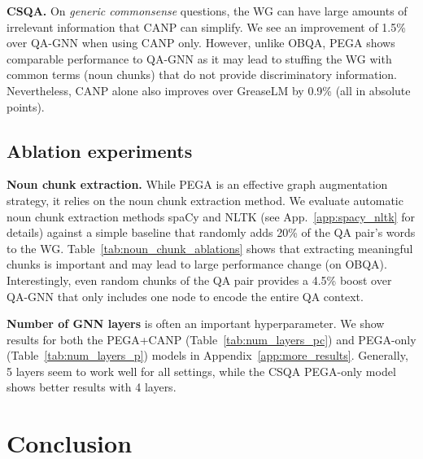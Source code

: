 \documentclass[11pt]{article}
\renewcommand{\paragraph}[1]{\vspace{1mm}\noindent\textbf{#1}}
\begin{document}
\paragraph{CSQA.}
On \emph{generic commonsense} questions, the WG can have large amounts of irrelevant information that CANP can simplify.
We see an improvement of 1.5\% over QA-GNN when using CANP only.
However, unlike OBQA, PEGA shows comparable performance to QA-GNN as it may lead to stuffing the WG with common terms (noun chunks) that do not provide discriminatory information.
Nevertheless, CANP alone also improves over GreaseLM by 0.9\% (all in absolute points).

\subsection{Ablation experiments}
\label{sec:ablation}





\paragraph{Noun chunk extraction.}
While PEGA is an effective graph augmentation strategy, it relies on the noun chunk extraction method.
We evaluate automatic noun chunk extraction methods spaCy and NLTK (see App.~\ref{app:spacy_nltk} for details) against a simple baseline that randomly adds 20\% of the QA pair's words to the WG.
Table~\ref{tab:noun_chunk_ablations} shows that extracting meaningful chunks is important and may lead to large performance change (on OBQA).
Interestingly, even random chunks of the QA pair provides a 4.5\% boost over QA-GNN that only includes one node to encode the entire QA context.


\paragraph{Number of GNN layers}
is often an important hyperparameter.
We show results for both the PEGA+CANP (Table~\ref{tab:num_layers_pc}) and PEGA-only (Table~\ref{tab:num_layers_p}) models in Appendix~\ref{app:more_results}.
Generally, 5 layers seem to work well for all settings, while the CSQA PEGA-only model shows better results with 4 layers.

\section{Conclusion}
\label{sec:conclusion}
\end{document}
